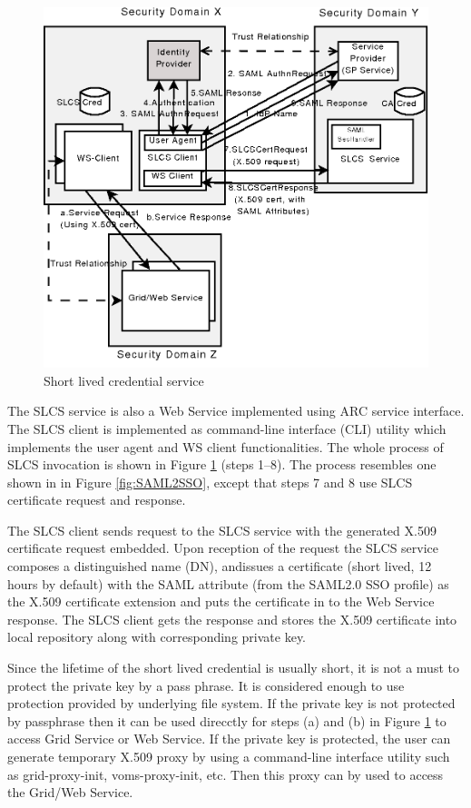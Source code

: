 \documentclass[twocolumn]{svjour3}         %
\begin{document}
\begin{figure}
\includegraphics[width=0.9\columnwidth]{SLCS.png}
\caption{Short lived credential service}
\label{fig:SLCS}
\end{figure}
The SLCS service is also a Web Service implemented using ARC service interface. The SLCS client is implemented as command-line interface (CLI) utility which implements the user agent and WS client functionalities. The whole process of SLCS invocation is shown in Figure \ref{fig:SLCS} (steps 1--8). The process resembles one shown in in Figure \ref{fig:SAML2SSO}, except that steps 7 and 8 use SLCS certificate request and response.

The SLCS client sends request to the SLCS service with the generated X.509 certificate request embedded. Upon reception of the request the SLCS service  composes a distinguished name (DN), andissues a certificate (short lived, 12 hours by default) with the SAML attribute (from the SAML2.0 SSO profile) as the X.509 certificate extension and puts the certificate in to the Web Service response. The SLCS client gets the response and stores the X.509 certificate into local repository along with corresponding private key.

Since the lifetime of the short lived credential is usually short, it is not a must to protect the private key by a pass phrase. It is considered enough to use protection  provided by underlying file system. If the private key is not protected by passphrase then it can be used direcctly for steps (a) and (b) in Figure \ref{fig:SLCS} to access Grid Service or Web Service. If the private key is protected, the user can generate temporary  X.509 proxy by using a command-line interface utility such as grid-proxy-init, voms-proxy-init, etc. Then this proxy can by used  to access the Grid/Web Service.
\end{document}
